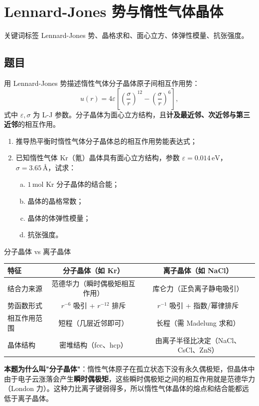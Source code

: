 \section{Lennard-Jones 势与惰性气体晶体}

\begin{tipbox}{关键词标签}
Lennard-Jones 势、晶格求和、面心立方、体弹性模量、抗张强度。
\end{tipbox}

\subsection{题目}

用 Lennard-Jones 势描述惰性气体分子晶体原子间相互作用势：
\[
  u(r) = 4\varepsilon\left[\left(\frac{\sigma}{r}\right)^{12} - \left(\frac{\sigma}{r}\right)^{6}\right] ,
\]
式中 $\varepsilon,\sigma$ 为 L-J 参数。分子晶体为面心立方结构，且\textbf{计及最近邻、次近邻与第三近邻}的相互作用。

\begin{enumerate}[(1)]
  \item 推导热平衡时惰性气体分子晶体总的相互作用势能表达式；
  \item 已知惰性气体 Kr（氪）晶体具有面心立方结构，参数 $\varepsilon = 0.014\,\text{eV}$，$\sigma = 3.65\,\text{\AA}$，试求：
  \begin{enumerate}[(a)]
    \item $1\,\text{mol}$ Kr 分子晶体的结合能；
    \item 晶体的晶格常数；
    \item 晶体的体弹性模量；
    \item 抗张强度。
  \end{enumerate}
\end{enumerate}

\begin{modelbox}{分子晶体 vs 离子晶体}
\begin{center}
\renewcommand{\arraystretch}{1.4}
\begin{tabular}{|l|c|c|}
\hline
\textbf{特征} & \textbf{分子晶体（如 Kr）} & \textbf{离子晶体（如 NaCl）} \\
\hline
结合力来源 & 范德华力（瞬时偶极矩相互作用） & 库仑力（正负离子静电吸引） \\
势函数形式 & $r^{-6}$ 吸引 + $r^{-12}$ 排斥 & $r^{-1}$ 吸引 + 指数/幂律排斥 \\
相互作用范围 & 短程（几层近邻即可） & 长程（需 Madelung 求和） \\
晶体结构 & 密堆结构（fcc、hcp） & 由离子半径比决定（NaCl、CsCl、ZnS） \\
\hline
\end{tabular}
\end{center}

\textbf{本题为什么叫"分子晶体"}：惰性气体原子在孤立状态下没有永久偶极矩，但晶体中由于电子云涨落会产生\textbf{瞬时偶极矩}，这些瞬时偶极矩之间的相互作用就是范德华力（London 力）。这种力比离子键弱得多，所以惰性气体晶体的熔点和结合能都远低于离子晶体。
\end{modelbox}


